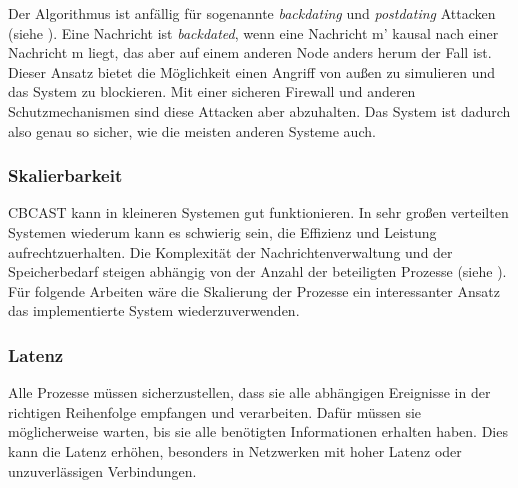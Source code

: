 Der Algorithmus ist anfällig für sogenannte \textit{backdating} und \textit{postdating} Attacken (siehe \cite{backdating}). Eine Nachricht ist \textit{backdated}, wenn eine Nachricht m’ kausal nach einer Nachricht m liegt, das aber auf einem anderen Node anders herum der Fall ist. Dieser Ansatz bietet die Möglichkeit einen Angriff von außen zu simulieren und das System zu blockieren. Mit einer sicheren Firewall und anderen Schutzmechanismen sind diese Attacken aber abzuhalten. Das System ist dadurch also genau so sicher, wie die meisten anderen Systeme auch.

\subsubsection{Skalierbarkeit}

CBCAST kann in kleineren Systemen gut funktionieren. In sehr großen verteilten Systemen wiederum kann es schwierig sein, die Effizienz und Leistung aufrechtzuerhalten. Die Komplexität der Nachrichtenverwaltung und der Speicherbedarf steigen abhängig von der Anzahl der beteiligten Prozesse (siehe \cite{scalability}).\\
Für folgende Arbeiten wäre die Skalierung der Prozesse ein interessanter Ansatz das implementierte System wiederzuverwenden.

\subsubsection{Latenz}

Alle Prozesse müssen sicherzustellen, dass sie alle abhängigen Ereignisse in der richtigen Reihenfolge  empfangen und verarbeiten. Dafür müssen sie möglicherweise warten, bis sie alle benötigten Informationen erhalten haben. Dies kann die Latenz erhöhen, besonders in Netzwerken mit hoher Latenz oder unzuverlässigen Verbindungen.